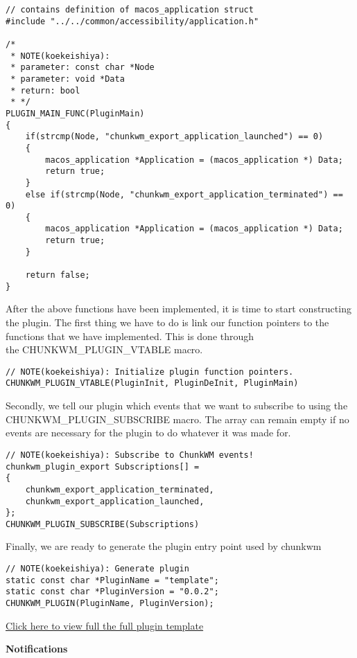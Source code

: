 \documentclass[14pt,a4paper]{article}
\begin{document}
\begin{lstlisting}[basicstyle=\tiny]
// contains definition of macos_application struct
#include "../../common/accessibility/application.h"

/*
 * NOTE(koekeishiya):
 * parameter: const char *Node
 * parameter: void *Data
 * return: bool
 * */
PLUGIN_MAIN_FUNC(PluginMain)
{
    if(strcmp(Node, "chunkwm_export_application_launched") == 0)
    {
        macos_application *Application = (macos_application *) Data;
        return true;
    }
    else if(strcmp(Node, "chunkwm_export_application_terminated") == 0)
    {
        macos_application *Application = (macos_application *) Data;
        return true;
    }

    return false;
}
\end{lstlisting}
After the above functions have been implemented, it is time to start constructing the plugin. The first thing we have to do is link our function pointers to the functions that we have implemented. This is done through 
\\the CHUNKWM\_PLUGIN\_VTABLE macro.
\begin{lstlisting}[basicstyle=\tiny]
// NOTE(koekeishiya): Initialize plugin function pointers.
CHUNKWM_PLUGIN_VTABLE(PluginInit, PluginDeInit, PluginMain)
\end{lstlisting}
Secondly, we tell our plugin which events that we want to subscribe to using the CHUNKWM\_PLUGIN\_SUBSCRIBE macro. The array can remain empty if no events are necessary for the plugin to do whatever it was made for.
\begin{lstlisting}[basicstyle=\tiny]
// NOTE(koekeishiya): Subscribe to ChunkWM events!
chunkwm_plugin_export Subscriptions[] =
{
    chunkwm_export_application_terminated,
    chunkwm_export_application_launched,
};
CHUNKWM_PLUGIN_SUBSCRIBE(Subscriptions)
\end{lstlisting}
Finally, we are ready to generate the plugin entry point used by chunkwm
\begin{lstlisting}[basicstyle=\tiny]
// NOTE(koekeishiya): Generate plugin
static const char *PluginName = "template";
static const char *PluginVersion = "0.0.2";
CHUNKWM_PLUGIN(PluginName, PluginVersion);
\end{lstlisting}
\href{https://github.com/koekeishiya/chunkwm/blob/master/src/plugins/template/plugin.cpp}{Click here to view full the full plugin template}
\\\bigskip
\begin{large}
\textbf{Notifications}
\end{large}
\end{document}
